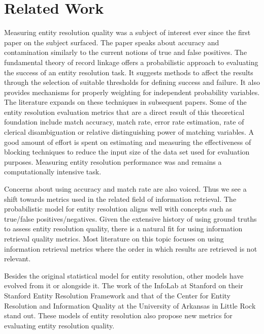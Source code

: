 \documentclass[a4paper,twoside]{article}
\begin{document}
    \section{Related Work}\label{sec:related}

    Measuring entity resolution quality was a subject of interest ever since the
    first paper on the subject surfaced\cite{newcombe1959}.
    The paper speaks about accuracy and contamination similarly to the current
    notions of true and false positives.
    The fundamental theory of record linkage\cite{fs1969} offers a probabilistic
    approach to evaluating the success of an entity resolution task.
    It suggests methods to affect the results through the selection of suitable
    thresholds for defining success and failure.
    It also provides mechanisms for properly weighting for independent
    probability variables.
    The literature expands on these techniques in subsequent
    papers\cite{winkler1990}.
    Some of the entity resolution evaluation metrics that are a direct result of
    this theoretical foundation include match accuracy, match
    rate\cite{jaro1989advances}, error rate estimation, rate of clerical
    disambiguation\cite{winkler1990} or relative distinguishing
    power of matching variables\cite{winkler2014}.
    A good amount of effort is spent on estimating and measuring the
    effectiveness of blocking techniques to reduce the input size of the data
    set used for evaluation purposes\cite{winkler1990,jaro1989advances}.
    Measuring entity resolution performance was and remains a computationally
    intensive task.
    
    Concerns about using accuracy and match rate are also voiced\cite{Goga2015}.
    Thus we see a shift towards metrics used in the related field of information
    retrieval.
    The probabilistic model for entity resolution aligns well with concepts such
    as true/false positives/negatives.
    Given the extensive history of using ground truths to assess entity
    resolution quality, there is a natural fit for using information retrieval
    quality metrics.
    Most literature on this topic focuses on using information retrieval metrics
    where the order in which results are retrieved is not
    relevant\cite{manning2008}.

    Besides the original statistical model for entity resolution, other models
    have evolved from it or alongside it.
    The work of the InfoLab at Stanford on their Stanford Entity Resolution
    Framework\cite{Ben2009Swoosh} and that of the Center for Entity Resolution
    and Information Quality at the University of Arkansas in Little
    Rock\cite{tal2007algebraic} stand out.
    These models of entity resolution also propose new metrics for evaluating
    entity resolution quality\cite{Men10,Tal11}.
\end{document}
